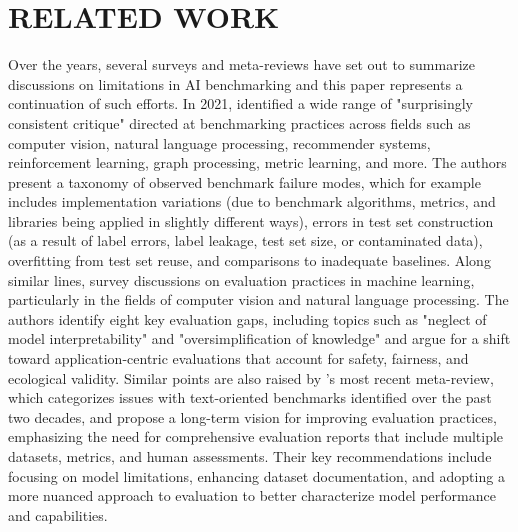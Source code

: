 \section{RELATED WORK}
Over the years, several surveys and meta-reviews have set out to summarize discussions on limitations in AI benchmarking and this paper represents a continuation of such efforts. %
In 2021, \citet[p.~1]{liao2021} identified a wide range of "surprisingly consistent critique" directed at benchmarking practices across fields such as computer vision, natural language processing, recommender systems, reinforcement learning, graph processing, metric learning, and more. The authors present a taxonomy of observed benchmark failure modes, which for example includes implementation variations (due to benchmark algorithms, metrics, and libraries being applied in slightly different ways), errors in test set construction (as a result of label errors, label leakage, test set size, or contaminated data), overfitting from test set reuse, and comparisons to inadequate baselines. Along similar lines, \citet{hutchinson_evaluation_2022} survey discussions on evaluation practices in machine learning, particularly in the fields of computer vision and natural language processing. The authors identify eight key evaluation gaps, including topics such as "neglect of model interpretability" and "oversimplification of knowledge" and argue for a shift toward application-centric evaluations that account for safety, fairness, and ecological validity. Similar points are also raised by \citet{gehrmann2023}'s most recent meta-review, which categorizes issues with text-oriented benchmarks identified over the past two decades, and propose a long-term vision for improving evaluation practices, emphasizing the need for comprehensive evaluation reports that include multiple datasets, metrics, and human assessments. Their key recommendations include focusing on model limitations, enhancing dataset documentation, and adopting a more nuanced approach to evaluation to better characterize model performance and capabilities.

